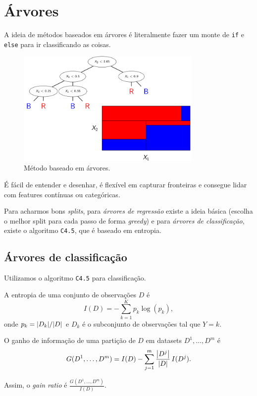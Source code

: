 \documentclass[a4paper,fleqn,12pt]{article}
\begin{document}
\section{Árvores}

A ideia de métodos baseados em árvores é literalmente fazer um monte de \texttt{if} e \texttt{else} para ir classificando as coisas.
\begin{figure}[H]
\centering
\includegraphics[width=0.8\textwidth]{fig/tree_method.png}
\caption{Método baseado em árvores.}
\label{fig:tree_method}
\end{figure}
É fácil de entender e desenhar, é flexível em capturar fronteiras e consegue lidar com features contínuas ou categóricas.

Para acharmos bons \textit{splits}, para \textit{árvores de regressão} existe a ideia básica (escolha o melhor split para cada passo de forma \textit{greedy}) e para \textit{árvores de classificação}, existe o algoritmo \texttt{C4.5}, que é baseado em entropia.

\subsection{Árvores de classificação}

Utilizamos o algoritmo \texttt{C4.5} para classificação.

A entropia de uma conjunto de observações $D$ é
$$
I(D) = - \sum_{k=1}^{K} p_k \log(p_k),
$$
onde $p_k = \abs{D_k} / \abs{D}$ e $D_k$ é o subconjunto de observações tal que $Y = k$.

O ganho de informação de uma partição de $D$ em datasets $D^1, \ldots, D^m$ é
$$
G(D^1, \ldots, D^m) = I(D) - \sum_{j=1}^{m} \frac{\abs{D^j}}{\abs{D}} \, I(D^j).
$$

Assim, o \textit{gain ratio} é $\frac{G(D^1, \ldots, D^m)}{I(D)}$.

\n
\end{document}
